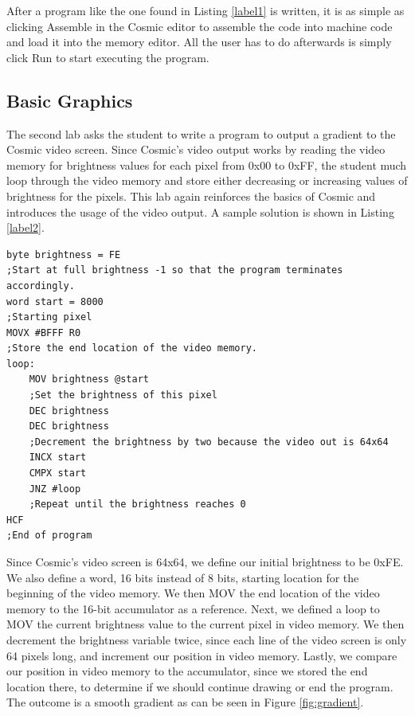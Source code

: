 \documentclass[conference]{IEEEtran}
\begin{document}
After a program like the one found in Listing \ref{label1} is written, it is as simple as clicking Assemble in the Cosmic editor to assemble the code into machine code and load it into the memory editor. All the user has to do afterwards is simply click Run to start executing the program.

\subsection{Basic Graphics}
The second lab asks the student to write a program to output a gradient to the Cosmic video screen. Since Cosmic's video output works by reading the video memory for brightness values for each pixel from 0x00 to 0xFF, the student much loop through the video memory and store either decreasing or increasing values of brightness for the pixels. This lab again reinforces the basics of Cosmic and introduces the usage of the video output. A sample solution is shown in Listing \ref{label2}.

\begin{lstlisting}[caption={Cosmic assembly to output a gradient to the video screen.}, label = {label2}]
byte brightness = FE
;Start at full brightness -1 so that the program terminates accordingly.
word start = 8000
;Starting pixel
MOVX #BFFF R0
;Store the end location of the video memory.
loop:
	MOV brightness @start
	;Set the brightness of this pixel
	DEC brightness
    DEC brightness
    ;Decrement the brightness by two because the video out is 64x64
	INCX start
	CMPX start
	JNZ #loop
	;Repeat until the brightness reaches 0
HCF
;End of program
\end{lstlisting}

Since Cosmic's video screen is 64x64, we define our initial brightness to be 0xFE. We also define a word, 16 bits instead of 8 bits, starting location for the beginning of the video memory. We then MOV the end location of the video memory to the 16-bit accumulator as a reference. Next, we defined a loop to MOV the current brightness value to the current pixel in video memory. We then decrement the brightness variable twice, since each line of the video screen is only 64 pixels long, and increment our position in video memory. Lastly, we compare our position in video memory to the accumulator, since we stored the end location there, to determine if we should continue drawing or end the program. The outcome is a smooth gradient as can be seen in Figure \ref{fig:gradient}.
\end{document}

